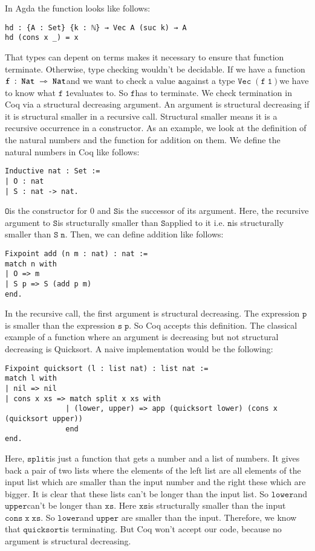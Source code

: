 \documentclass[a4paper,cleardoubleempty,BCOR1cm]{scrbook}
\begin{document}
In Agda the function looks like follows:
\begin{verbatim}
hd : {A : Set} {k : ℕ} → Vec A (suc k) → A
hd (cons x _) = x
\end{verbatim}
That types can depent on terms makes it necessary to ensure that function
\linebreak terminate. Otherwise, type checking wouldn't be decidable. If we have a
function \linebreak $\mathtt{f\;:\;Nat\;\rightarrowtriangle\;Nat}$\;and we want to check a value $\mathtt{a}$\;against a type
$\mathtt{Vec\;(f\;1)}$\;we have to know what $\mathtt{f\;1}$\;evaluates to. So $\mathtt{f}$\;has to terminate.
We check termination in Coq via a structural decreasing argument. An argument
is structural decreasing if it is structural smaller in a recursive call.
Structural smaller means it is a recursive occurrence in a constructor. As an
example, we look at the definition of the natural numbers and the function for addition
on them. We define the natural numbers in Coq like follows:
\begin{verbatim}
Inductive nat : Set :=
| O : nat
| S : nat -> nat.
\end{verbatim}
$\mathtt{O}$\;is the constructor for 0 and $\mathtt{S}$\;is the successor of its argument. Here,
the recursive argument to $\mathtt{S}$\;is structurally smaller than $\mathtt{S}$\;applied to it i.e.
$\mathtt{n}$\;is structurally smaller than $\mathtt{S\;n}$. Then, we can define addition like follows:
\begin{verbatim}
Fixpoint add (n m : nat) : nat :=
match n with
| O => m
| S p => S (add p m)
end.
\end{verbatim}
In the recursive call, the first argument is structural decreasing. The
expression $\mathtt{p}$\;is smaller than the expression $\mathtt{s\;p}$. So Coq accepts this
definition. The classical example of a function where an argument is
decreasing but not structural decreasing is Quicksort. A naive implementation
would be the following:
\begin{verbatim}
Fixpoint quicksort (l : list nat) : list nat :=
match l with
| nil => nil
| cons x xs => match split x xs with
              | (lower, upper) => app (quicksort lower) (cons x (quicksort upper))
              end
end.
\end{verbatim}
Here, $\mathtt{split}$\;is just a function that gets a number and a list of numbers. It
gives back a pair of two lists where the elements of the left list are all
elements of the input list which are smaller than the input number and the
right these which are bigger. It is clear that these lists can't be longer
than the input list. So $\mathtt{lower}$\;and $\mathtt{upper}$\;can't be longer than $\mathtt{xs}$. Here
$\mathtt{xs}$\;is structurally smaller than the input $\mathtt{cons\;x\;xs}$. So $\mathtt{lower}$\;and $\mathtt{upper}$
are smaller than the input. Therefore, we know that $\mathtt{quicksort}$\;is terminating.
But Coq won't accept our code, because no argument is structural decreasing.
\end{document}
